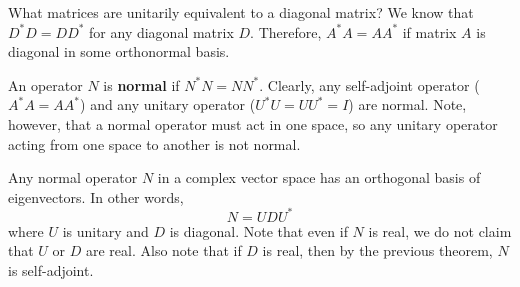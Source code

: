 What matrices are unitarily equivalent to a diagonal matrix? We know that $D^{*} D = DD^{*}$ for any diagonal matrix $D$. Therefore, $A^{*} A = AA^{*}$ if matrix $A$ is diagonal in some orthonormal basis. 

\begin{definition}
An operator $N$ is \textbf{normal} if $N^{*}N = NN^{*}$. Clearly, any self-adjoint operator ($A^{*}A = AA^{*}$) and any unitary operator ($U^{*}U = UU^{*} = I$) are normal. Note, however, that a normal operator must act in one space, so any unitary operator acting from one space to another is not normal. 
\end{definition}

\begin{theorem}
Any normal operator $N$ in a complex vector space has an orthogonal basis of eigenvectors. In other words, 
$$N = UDU^{*}$$
where $U$ is unitary and $D$ is diagonal. Note that even if $N$ is real, we do not claim that $U$ or $D$ are real. Also note that if $D$ is real, then by the previous theorem, $N$ is self-adjoint. 
\end{theorem}


